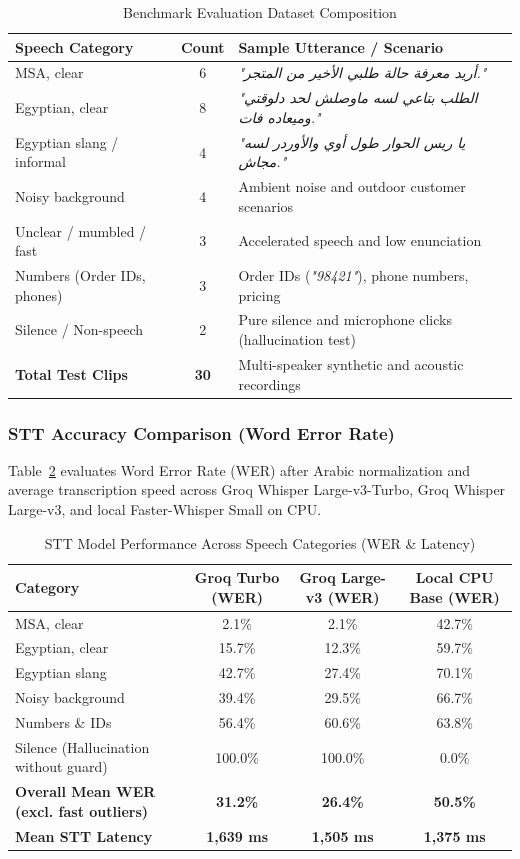 \begin{table}[htbp]
\centering
\caption{Benchmark Evaluation Dataset Composition}
\label{tab:test_audio_dataset}
\begin{tabular}{lcp{8.5cm}}
\toprule
\textbf{Speech Category} & \textbf{Count} & \textbf{Sample Utterance / Scenario} \\
\midrule
MSA, clear & 6 & \textit{"أريد معرفة حالة طلبي الأخير من المتجر."} \\
Egyptian, clear & 8 & \textit{"الطلب بتاعي لسه ماوصلش لحد دلوقتي وميعاده فات."} \\
Egyptian slang / informal & 4 & \textit{"يا ريس الحوار طول أوي والأوردر لسه مجاش."} \\
Noisy background & 4 & Ambient noise and outdoor customer scenarios \\
Unclear / mumbled / fast & 3 & Accelerated speech and low enunciation \\
Numbers (Order IDs, phones) & 3 & Order IDs (\textit{"98421"}), phone numbers, pricing \\
Silence / Non-speech & 2 & Pure silence and microphone clicks (hallucination test) \\
\midrule
\textbf{Total Test Clips} & \textbf{30} & Multi-speaker synthetic and acoustic recordings \\
\bottomrule
\end{tabular}
\end{table}

\subsubsection{STT Accuracy Comparison (Word Error Rate)}
Table~\ref{tab:stt_wer_results} evaluates Word Error Rate (WER) after Arabic normalization and average transcription speed across Groq Whisper Large-v3-Turbo, Groq Whisper Large-v3, and local Faster-Whisper Small on CPU.

\begin{table}[htbp]
\centering
\caption{STT Model Performance Across Speech Categories (WER \& Latency)}
\label{tab:stt_wer_results}
\begin{tabular}{lccc}
\toprule
\textbf{Category} & \textbf{Groq Turbo (WER)} & \textbf{Groq Large-v3 (WER)} & \textbf{Local CPU Base (WER)} \\
\midrule
MSA, clear & 2.1\% & 2.1\% & 42.7\% \\
Egyptian, clear & 15.7\% & 12.3\% & 59.7\% \\
Egyptian slang & 42.7\% & 27.4\% & 70.1\% \\
Noisy background & 39.4\% & 29.5\% & 66.7\% \\
Numbers \& IDs & 56.4\% & 60.6\% & 63.8\% \\
Silence (Hallucination without guard) & 100.0\% & 100.0\% & 0.0\% \\
\midrule
\textbf{Overall Mean WER (excl. fast outliers)} & \textbf{31.2\%} & \textbf{26.4\%} & \textbf{50.5\%} \\
\textbf{Mean STT Latency} & \textbf{1,639 ms} & \textbf{1,505 ms} & \textbf{1,375 ms} \\
\bottomrule
\end{tabular}
\end{table}

